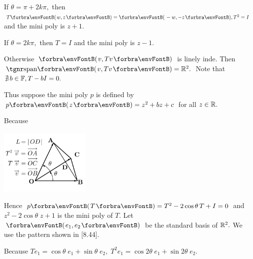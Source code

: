 \documentclass[a4paper, 11pt, UTF8]{article}
\begin{document}
\begin{large}
\par\quad
If $\theta=\pi+2k\pi,$ then $T\Par{w,z}=\Par{-w,-z},T^2=I$ and the mini poly is $z+1.$\par\quad
If $\theta=2k\pi,$ then $T=I$ and the mini poly is $z-1.$\par\quad
Otherwise $\Par{v,Tv}$ is linely inde. Then $\Span{v,Tv}=\Rbb^2.$ Note that $\nexists\,b\in{\mathbb{F}},T-bI=0.$\par\quad
\par\vspace{-16pt}\quad
Thus suppose the mini poly $p$ is defined by $p\Par{z}=z^2+bz+c$ for all $z\in{\mathbb{R}}.$\par\vspace{20pt}\quad
Because\vspace{-35pt}\par\quad
\hspace{50pt}\includegraphics[width=4.4cm,height=3.2cm,scale=0.22]{./diagram2.png}\par\vspace{-70pt}\quad
{}\par\quad
Hence $p\Par{T}=T^2-2\cos\theta\, T+I=0$ and $z^2-2\cos\theta\;z+1$ is the mini poly of $T.$\PfEnd\vspace{6pt}\quad
\Or Let $\Par{e_1,e_2}$ be the standard basis of ${\mathbb{R}}^2.$ We use the pattern shown in [8.44].\par\quad
Because $Te_1=\cos\theta\;e_1+\sin\theta\;e_2,\;T^2e_1=\cos2\theta\;e_1+\sin2\theta\;e_2.$\par\vspace{2pt}\quad

\end{large}
\end{document}
